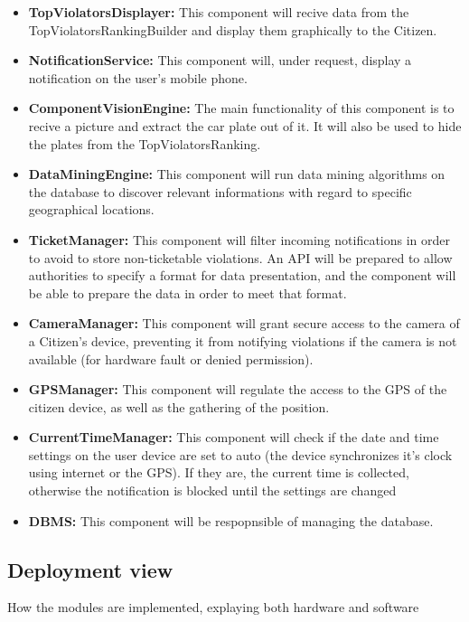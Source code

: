 \documentclass{article}
\begin{document}
\begin{itemize}
		 \item \label{component:TopViolatorsDisplayer} \textbf{TopViolatorsDisplayer:}
		 	This component will recive data from the TopViolatorsRankingBuilder and display them graphically to the Citizen.
		 \item \label{component:NotificationService} \textbf{NotificationService:}
		 	This component will, under request, display a notification on the user's mobile phone.
		 \item \label{component:ComputerVisionEngine} \textbf{ComponentVisionEngine:}
		 	The main functionality of this component is to recive a picture and extract the car plate out of it.
		 	It will also be used to hide the plates from the TopViolatorsRanking.
		 \item \label{component:DataMiningEngine} \textbf{DataMiningEngine:}
		 	This component will run data mining algorithms on the database to discover relevant informations with regard to specific geographical
		 	locations.
		 \item \label{component:TicketManager} \textbf{TicketManager:}
		 	This component will filter incoming notifications in order to avoid to store non-ticketable violations. An API will be prepared to allow 
		 	authorities to specify a format for data presentation, and the component will be able to prepare the data in order to meet that format.
		 \item \label{component:CameraManager} \textbf{CameraManager:}
		 	This component will grant secure access to the camera of a Citizen's device, preventing it from notifying violations if the camera is not 
		 	available (for hardware fault or denied permission).
		 \item \label{component:GPSManager} \textbf{GPSManager:}
		 	This component will regulate the access to the GPS of the citizen device, as well as the gathering of the position.
		 \item \label{component:CurrentTimeManager} \textbf{CurrentTimeManager:}
		 	This component will check if the date and time settings on the user device are set to auto (the device synchronizes it's clock using 
		 	internet or the GPS). If they are, the current time is collected, otherwise the notification is blocked until the settings are changed
		 \item \label{component:DBMS} \textbf{DBMS:}
		 	This component will be respopnsible of managing the database.
	\end{itemize}
	\subsection{Deployment view} How the modules are implemented, explaying both hardware and software
\end{document}
